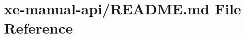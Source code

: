\hypertarget{xe-manual-api_2README_8md}{}\section{xe-\/manual-\/api/\+R\+E\+A\+D\+M\+E.md File Reference}
\label{xe-manual-api_2README_8md}
